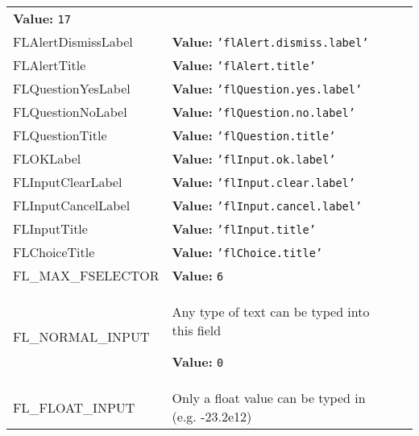 \begin{longtable}{|p{\varnamewidth}|p{\vardescrwidth}|l}
\textbf{Value:} 
{\tt 17}&\\
\cline{1-2}
\raggedright F\-L\-A\-l\-e\-r\-t\-D\-i\-s\-m\-i\-s\-s\-L\-a\-b\-e\-l\- & \raggedright \textbf{Value:} 
{\tt \texttt{'}\texttt{flAlert.dismiss.label}\texttt{'}}&\\
\cline{1-2}
\raggedright F\-L\-A\-l\-e\-r\-t\-T\-i\-t\-l\-e\- & \raggedright \textbf{Value:} 
{\tt \texttt{'}\texttt{flAlert.title}\texttt{'}}&\\
\cline{1-2}
\raggedright F\-L\-Q\-u\-e\-s\-t\-i\-o\-n\-Y\-e\-s\-L\-a\-b\-e\-l\- & \raggedright \textbf{Value:} 
{\tt \texttt{'}\texttt{flQuestion.yes.label}\texttt{'}}&\\
\cline{1-2}
\raggedright F\-L\-Q\-u\-e\-s\-t\-i\-o\-n\-N\-o\-L\-a\-b\-e\-l\- & \raggedright \textbf{Value:} 
{\tt \texttt{'}\texttt{flQuestion.no.label}\texttt{'}}&\\
\cline{1-2}
\raggedright F\-L\-Q\-u\-e\-s\-t\-i\-o\-n\-T\-i\-t\-l\-e\- & \raggedright \textbf{Value:} 
{\tt \texttt{'}\texttt{flQuestion.title}\texttt{'}}&\\
\cline{1-2}
\raggedright F\-L\-O\-K\-L\-a\-b\-e\-l\- & \raggedright \textbf{Value:} 
{\tt \texttt{'}\texttt{flInput.ok.label}\texttt{'}}&\\
\cline{1-2}
\raggedright F\-L\-I\-n\-p\-u\-t\-C\-l\-e\-a\-r\-L\-a\-b\-e\-l\- & \raggedright \textbf{Value:} 
{\tt \texttt{'}\texttt{flInput.clear.label}\texttt{'}}&\\
\cline{1-2}
\raggedright F\-L\-I\-n\-p\-u\-t\-C\-a\-n\-c\-e\-l\-L\-a\-b\-e\-l\- & \raggedright \textbf{Value:} 
{\tt \texttt{'}\texttt{flInput.cancel.label}\texttt{'}}&\\
\cline{1-2}
\raggedright F\-L\-I\-n\-p\-u\-t\-T\-i\-t\-l\-e\- & \raggedright \textbf{Value:} 
{\tt \texttt{'}\texttt{flInput.title}\texttt{'}}&\\
\cline{1-2}
\raggedright F\-L\-C\-h\-o\-i\-c\-e\-T\-i\-t\-l\-e\- & \raggedright \textbf{Value:} 
{\tt \texttt{'}\texttt{flChoice.title}\texttt{'}}&\\
\cline{1-2}
\raggedright F\-L\-\_\-M\-A\-X\-\_\-F\-S\-E\-L\-E\-C\-T\-O\-R\- & \raggedright \textbf{Value:} 
{\tt 6}&\\
\cline{1-2}
\raggedright F\-L\-\_\-N\-O\-R\-M\-A\-L\-\_\-I\-N\-P\-U\-T\- & \raggedright Any type of text can be typed into this field

\textbf{Value:} 
{\tt 0}&\\
\cline{1-2}
\raggedright F\-L\-\_\-F\-L\-O\-A\-T\-\_\-I\-N\-P\-U\-T\- & \raggedright Only a float value can be typed in (e.g. -23.2e12)


\end{longtable}
